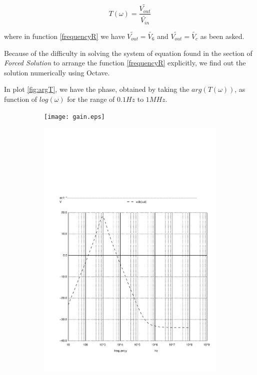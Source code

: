 \begin{equation}
  T(\omega) = \frac{\widetilde{V_{out}}}{\widetilde{V_{in}}}
  \label{frequencyR}
\end{equation}

where in function \ref{frequencyR} we have $\widetilde{V_{out}} = \tilde{V_6}$ and $\widetilde{V_{out}} = \tilde{V_c}$ as been asked.

Because of the difficulty in solving the system of equation found in the section of \textit{Forced Solution} to arrange the function \ref{frequencyR} explicitly, we find out the solution numerically using Octave.

In plot \ref{fig:argT}, we have the phase, obtained by taking the $arg(T(\omega))$, as function of $log(\omega)$ for the range of $0.1Hz$ to $1MHz$.

\begin{figure}[h]
  \centering
  \begin{subfigure}{0.5\textwidth}
      \texttt{[image: gain.eps]}
      \label{fig:output1}
  \end{subfigure}
  \begin{subfigure}{0.4\textwidth}
      \includegraphics[width=\linewidth, clip]{gain.pdf}
      \label{fig:output2}
  \end{subfigure}
  \caption{\small }
  \label{output_deviation}
\end{figure}


